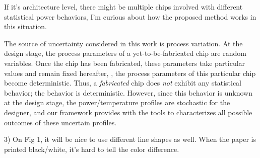 \begin{reviewer}
If it’s architecture level, there might be multiple chips involved with different statistical power behaviors, I’m curious about how the proposed method works in this situation.
\end{reviewer}
\begin{authors}
The source of uncertainty considered in this work is process variation.
At the design stage, the process parameters of a yet-to-be-fabricated chip are random variables.
Once the chip has been fabricated, these parameters take particular values and remain fixed hereafter, \ie, the process parameters of this particular chip become deterministic.
Thus, a \emph{fabricated} chip does \emph{not} exhibit any statistical behavior; the behavior is deterministic.
However, since this behavior is unknown at the design stage, the power/temperature profiles are stochastic for the designer, and our framework provides with the tools to characterizes all possible outcomes of these uncertain profiles.

\end{authors}

\begin{reviewer}
3) On Fig 1, it will be nice to use different line shapes as well. When the paper is printed black/white, it’s hard to tell the color difference.
\end{reviewer}
\begin{authors}


\end{authors}
